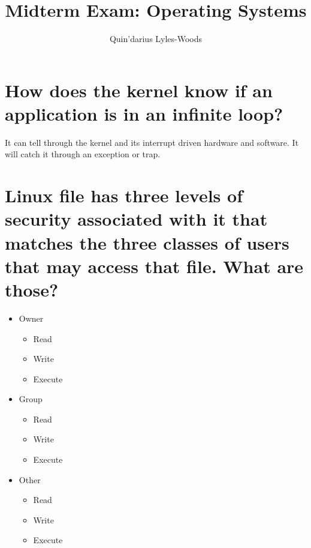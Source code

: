 \documentclass{article}
\title{Midterm Exam: Operating Systems}
\author{Quin'darius Lyles-Woods}
\begin{document}
\maketitle

\section{How does the kernel know if an application is in an infinite loop?}
It can tell through the kernel and its interrupt driven hardware and software. It will catch it through an exception or trap.
\section{Linux file has three levels of security associated with it that matches the three classes of users that may access that file. What are those?}

\begin{itemize}
	\item Owner
	\begin{itemize}
		\item Read
		\item Write
		\item Execute
	\end{itemize}
	\item Group
	\begin{itemize}
		\item Read
		\item Write
		\item Execute
	\end{itemize}
	\item Other
	\begin{itemize}
		\item Read
		\item Write
		\item Execute
	\end{itemize}
\end{itemize}
\end{document}
